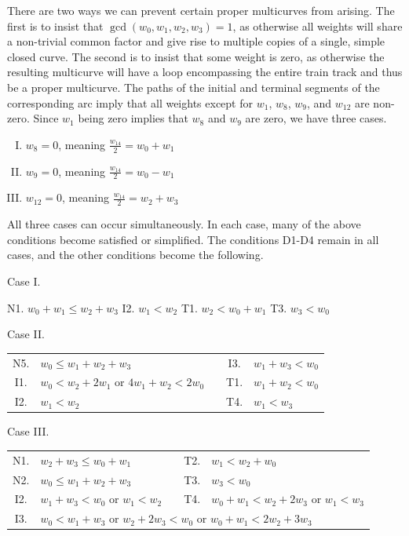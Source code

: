 There are two ways we can prevent certain proper multicurves from arising. The first is to insist that $\gcd(w_0, w_1, w_2, w_3) = 1$, as otherwise all weights will share a non-trivial common factor and give rise to multiple copies of a single, simple closed curve. The second is to insist that some weight is zero, as otherwise the resulting multicurve will have a loop encompassing the entire train track and thus be a proper multicurve. The paths of the initial and terminal segments of the corresponding arc imply that all weights except for $w_1$, $w_8$, $w_9$, and $w_{12}$ are non-zero. Since $w_1$ being zero implies that $w_8$ and $w_9$ are zero, we have three cases.
\begin{enumerate}[(I)]
 \indentedlist
 \item
  $w_8 = 0$, meaning $\frac{w_{14}}{2} = w_0 + w_1$
 \item
  $w_9 = 0$, meaning $\frac{w_{14}}{2} = w_0 - w_1$
 \item
  $w_{12} = 0$, meaning $\frac{w_{14}}{2} = w_2 + w_3$
\end{enumerate}
All three cases can occur simultaneously. In each case, many of the above conditions become satisfied or simplified. The conditions D1-D4 remain in all cases, and the other conditions become the following.
\begin{center}
 Case I.
 
 N1. $w_0 + w_1 \leq w_2 + w_3$ \qquad I2. $w_1 < w_2$ \qquad T1. $w_2 < w_0 + w_1$ \qquad  T3. $w_3 < w_0$
\end{center}

\begin{center}
 Case II.
 
 \begin{tabular}{clccl}
  N5. & $w_0 \leq w_1 + w_2 + w_3$ & \qquad \qquad & I3. & $w_1 + w_3 < w_0$\\
  I1. & $w_0 < w_2 + 2w_1$ \quad or \quad $4w_1 + w_2 < 2w_0$  && T1. & $w_1 + w_2 < w_0$\\
  I2. & $w_1 < w_2$ && T4. & $w_1 < w_3$\\
 \end{tabular}
\end{center}

\begin{center}
 Case III.
 
 \begin{tabular}{clccl}
  N1. & $w_2 + w_3 \leq w_0 + w_1$ & \qquad & T2. & $w_1 < w_2 + w_0$\\
  N2. & $w_0 \leq w_1 + w_2 + w_3$ && T3. & $w_3 < w_0$\\
  I2. & $w_1 + w_3 < w_0$ \quad or \quad $w_1 < w_2$ && T4. & $w_0 + w_1 < w_2 + 2w_3$ \quad or \quad $w_1 < w_3$\\
  I3. & \multicolumn{4}{l}{$w_0 < w_1 + w_3$ \quad or \quad $w_2 + 2w_3 < w_0$ \quad or \quad $w_0 + w_1 < 2w_2 + 3w_3$}\\
 \end{tabular}
\end{center}


